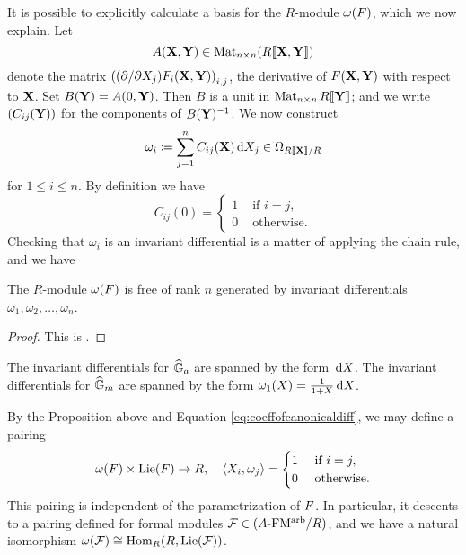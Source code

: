 It is possible to explicitly calculate a basis for the $R$-module
$\omega({F})$, which we now explain. Let 
$$A(\mathbf{X}, \mathbf{Y}) \in \operatorname{Mat}_{n \times n} (R\llbracket \mathbf{X}, \mathbf{Y} \rrbracket)$$ 
denote the matrix $\left((\partial/\partial X_j)F_i (\mathbf{X},\mathbf{Y})\right)_{i,j}$,
the derivative of ${F}(\mathbf{X},\mathbf{Y})$ with respect to $\mathbf{X}$. Set 
$B(\mathbf{Y}) = A(0,\mathbf{Y})$. Then $B$ is a unit in $\operatorname{Mat}_{n \times n} R\llbracket \mathbf{Y} \rrbracket$; 
and we write $(C_{ij}(\mathbf{Y}))$ for the components of 
$B(\mathbf{Y})^{-1}$. We now construct 
$$\omega_{i} \coloneqq \sum_{j=1}^n C_{ij}(\mathbf{X}) \, \mathrm{d} X_j \in \Omega_{R\llbracket \mathbf{X} \rrbracket/R}$$ 
for $1 \leq i \leq n$. By definition we have 
\begin{equation}\label{eq:coeffofcanonicaldiff}
  C_{ij}(0) = \begin{cases}
    1 &\text{ if }i = j,\\
    0 &\text{ otherwise.}
  \end{cases}
\end{equation}
Checking that $\omega_{i}$ is an invariant differential is a matter of
applying the chain rule, and we have
\begin{prop}
    The $R$-module $\omega({F})$ is free of rank $n$ generated by invariant differentials
    $\omega_{1}, \omega_{2}, \dots, \omega_{n}$.
\begin{proof}
  This is \cite[Proposition 1.1]{1970HondaFormalGroups}. 
\end{proof}
\end{prop}
\begin{xpl}
  The invariant differentials for $\widehat{\mathbb{G}}_a$ are spanned by the form $\, \mathrm{d} X$. 
  The invariant differentials for $\widehat{\mathbb{G}}_m$ are spanned by the form 
  $\omega_1(X) = \frac 1{1+X} \, \mathrm{d} X$.
\end{xpl}
By the Proposition above and Equation \eqref{eq:coeffofcanonicaldiff}, we may
define a pairing
\begin{equation*}
  \omega({F}) \times \operatorname{Lie}({F}) \to R, \quad \langle X_i, \omega_j \rangle =
  \begin{cases}
    1 &\text{ if } i = j,\\
    0 &\text{ otherwise.}
  \end{cases}
\end{equation*}
This pairing is independent of the parametrization of ${F}$. In particular, it
descents to a pairing defined for formal modules $\mathcal{F} \in {({A}\text-\mathrm{FM^{arb}}/{R})}$, and
we have a natural isomorphism $\omega(\mathcal{F}) \cong \operatorname{Hom}_R(R, \operatorname{Lie}(\mathcal{F}))$.

